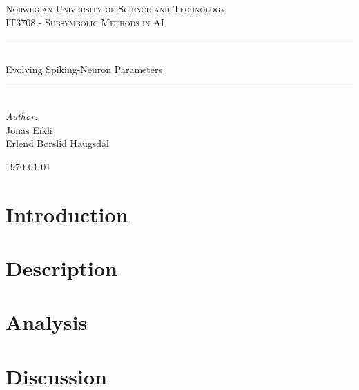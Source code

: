 \documentclass[12pt, a4paper, oneside, titlepage]{article}
\newcommand{\HRule}{\rule{\linewidth}{0.5mm}}
\begin{document}
\begin{titlepage}
\begin{center}
\thispagestyle{empty}

\textsc{\large Norwegian University of Science and Technology} \\
\textsc{IT3708 - Subsymbolic Methods in AI} \\[3cm]
\HRule\\[0.5cm]
{\Huge Evolving Spiking-Neuron Parameters}\\[0.5cm]
\HRule\\[3.5cm]

{\large \emph{Author:}}\\
Jonas Eikli\\
Erlend B\o rslid Haugsdal

\vfill

{\large \today}


\end{center}
\end{titlepage}




\tableofcontents

\newpage

\section{Introduction}



\section{Description}



\section{Analysis}




\section{Discussion}
\end{document}
